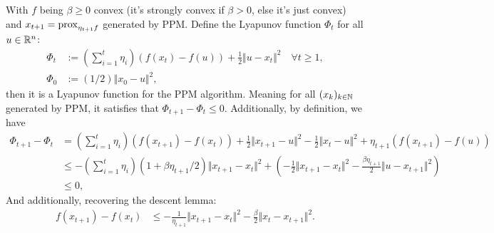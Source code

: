 \documentclass[12pt]{article}
\begin{document}
        \begin{theorem}\label{ppm_lyapunov}
            With $f$ being $\beta\ge 0$ convex (it's strongly convex if $\beta > 0$, else it's just convex) and $x_{t + 1} = \operatorname{prox}_{\eta_{t + 1}f}$ generated by PPM. 
            Define the Lyapunov function $\Phi_t$ for all $u \in \mathbb R^n$: 
            \begin{align*}
                \Phi_t &:= 
                \left(
                    \sum_{i = 1}^{t} \eta_i
                \right)(f(x_t) - f(u)) + \frac{1}{2} \Vert u - x_t\Vert^2 \quad \forall t \ge 1, 
                \\
                \Phi_0 &:= (1/2)\Vert x_0 - u\Vert^2, 
            \end{align*}
            then it is a Lyapunov function for the PPM algorithm. 
            Meaning for all $(x_k)_{k \in \mathbb N}$ generated by PPM, it satisfies that $\Phi_{t + 1} - \Phi_t \le 0$. 
            Additionally, by definition, we have 
            {\small
                \begin{align*}
                    \Phi_{t + 1} - \Phi_{t} 
                    &= 
                    \left(\sum_{i = 1}^{t}\eta_{i}\right)
                    (f(x_{t + 1}) - f(x_t)) 
                    + \frac{1}{2}\Vert x_{t + 1} - u\Vert^2 
                    - \frac{1}{2}\Vert x_{t} - u\Vert^2
                    +
                    \eta_{t + 1}(f(x_{t + 1}) - f(u))
                    \\
                    & \le 
                    -\left(\sum_{i = 1}^{t}\eta_{i}\right)
                    (1 + \beta\eta_{t + 1}/2)\Vert x_{t + 1} - x_t\Vert^2
                    + 
                    \left(
                        - \frac{1}{2}\Vert x_{t + 1} - x_t\Vert^2
                        -\frac{\beta\eta_{t + 1}}{2}\Vert u - x_{t + 1}\Vert^2
                    \right)
                    \\
                    & \le 0,
                \end{align*}
            }
            And additionally, recovering the descent lemma: 
            \begin{align*}
                f(x_{t + 1}) - f(x_t) 
                &\le
                -\frac{1}{\eta_{t+1}} \Vert x_{t + 1} - x_t\Vert^2 
                - \frac{\beta}{2}\Vert x_t - x_{t + 1}\Vert^2. 
            \end{align*}
        \end{theorem}
\end{document}
